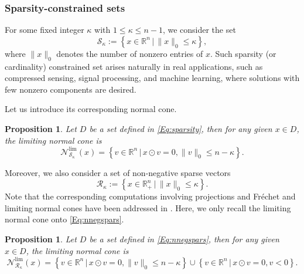 \documentclass[11pt,a4paper,reqno]{amsart}
\newtheorem{proposition}[theorem]{Proposition}
\begin{document}
{\subsubsection{Sparsity-constrained sets}
For some fixed integer $\kappa$ with $1 \leq \kappa \leq n-1$, we consider the set
\begin{equation}\label{Eq:sparsity}
    \mathcal S_{\kappa}:=\left\{x\in \mathbb R^n \,\big|\, \|x\|_0 \leq \kappa \right\},
\end{equation}
where $\|x\|_0$ denotes the number of nonzero entries of $x$. Such sparsity (or cardinality) constrained set arises naturally in real applications, such as compressed sensing, signal processing, and machine learning, where solutions with few nonzero components are desired. 

Let us introduce its corresponding normal cone.

\begin{proposition}\label{Prop:sparsitylnc}
    \cite[Remark~3.6]{tam2017regularity} Let $D$ be a set defined in \eqref{Eq:sparsity}, then for any given $x\in D$, the limiting normal cone is 
    \begin{equation*}
        \mathcal N^{\text{lim}}_{\mathcal S_{\kappa}}(x)=
            \left\{ v\in \mathbb R^n \,\big|\, x \odot v=0, \|v\|_0 \leq n-\kappa\right\}.
    \end{equation*}
\end{proposition}

Moreover, we also consider a set of non-negative sparse vectors
\begin{equation}\label{Eq:nnegspars}
    \mathcal R_{\kappa}:=\left\{x \in \mathbb R^n_+ \,\big|\, \|x\|_0 \leq \kappa\right\}.
\end{equation}
Note that the corresponding computations involving projections and Fréchet and limiting normal cones have been addressed in \cite{tam2017regularity}. Here, we only recall the limiting normal cone onto \eqref{Eq:nnegspars}.

\begin{proposition}\label{Prop:sparsitylncpositive}
    \cite[Theorem~3.4]{tam2017regularity} Let $D$ be a set defined in \eqref{Eq:nnegspars}, then for any given $x\in D$, the limiting normal cone is 
    \begin{equation*}
        \mathcal N^{\text{lim}}_{\mathcal R_{\kappa}}(x)=
            \left\{ v\in \mathbb R^n \,\big|\, x \odot v=0, \|v\|_0 \leq n-\kappa\right\} \cup  \left\{ v\in \mathbb R^n \,\big|\, x\odot v=0, v<0 \right\}.
    \end{equation*}
\end{proposition}

}
\end{document}
